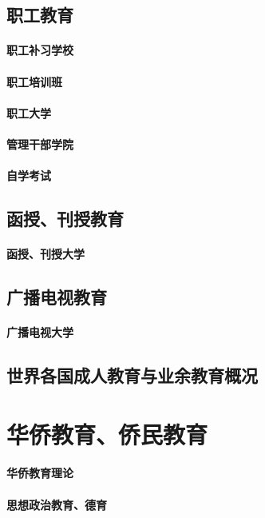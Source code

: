 \documentclass[UTF8]{../../ApplicationUniverse}
\begin{document}
\section{职工教育}
    \subsubsection{职工补习学校}
    \subsubsection{职工培训班}
    \subsubsection{职工大学}
    \subsubsection{管理干部学院}
    \subsubsection{自学考试}
\section{函授、刊授教育}
    \subsubsection{函授、刊授大学}
\section{广播电视教育}
    \subsubsection{广播电视大学}
\section{世界各国成人教育与业余教育概况}






\chapter{华侨教育、侨民教育}
    \subsubsection{华侨教育理论}
    \subsubsection{思想政治教育、德育}
\end{document}
